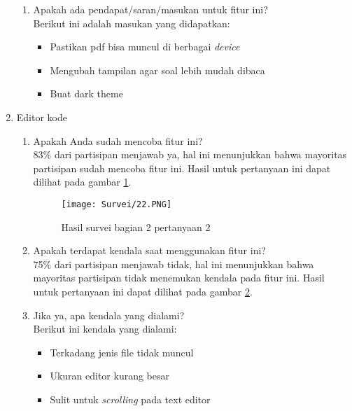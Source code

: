 \begin{enumerate}
\begin{enumerate}
        \item Apakah ada pendapat/saran/masukan untuk fitur ini? \\ Berikut ini adalah masukan yang didapatkan:
        \begin{itemize}
            \item Pastikan pdf bisa muncul di berbagai \textit{device}
            \item Mengubah tampilan agar soal lebih mudah dibaca
            \item Buat dark theme
        \end{itemize}
    \end{enumerate}
    \item Editor kode
    \begin{enumerate}
        \begin{figure}[H]
        	\centering  
        	\texttt{[image: Survei/21.PNG]}  
        	\caption{Hasil survei bagian 2 pertanyaan 1}
        	\label{fig:5:survei21} 
        \end{figure}
        \item Apakah Anda sudah mencoba fitur ini? \\ 83\% dari partisipan menjawab ya, hal ini menunjukkan bahwa mayoritas partisipan sudah mencoba fitur ini. Hasil untuk pertanyaan ini dapat dilihat pada gambar \ref{fig:5:survei21}.
            \begin{figure}[H]
        	\centering  
        	\texttt{[image: Survei/22.PNG]}  
        	\caption{Hasil survei bagian 2 pertanyaan 2}
        	\label{fig:5:survei22} 
        \end{figure}
        \item Apakah terdapat kendala saat menggunakan fitur ini? \\ 75\% dari partisipan menjawab tidak, hal ini menunjukkan bahwa mayoritas partisipan tidak menemukan kendala pada fitur ini. Hasil untuk pertanyaan ini dapat dilihat pada gambar \ref{fig:5:survei22}.
        \item Jika ya, apa kendala yang dialami? \\ Berikut ini kendala yang dialami:
        \begin{itemize}
            \item Terkadang jenis file tidak muncul
            \item Ukuran editor kurang besar
            \item Sulit untuk \textit{scrolling} pada text editor
        \end{itemize}

\end{enumerate}
\end{enumerate}

